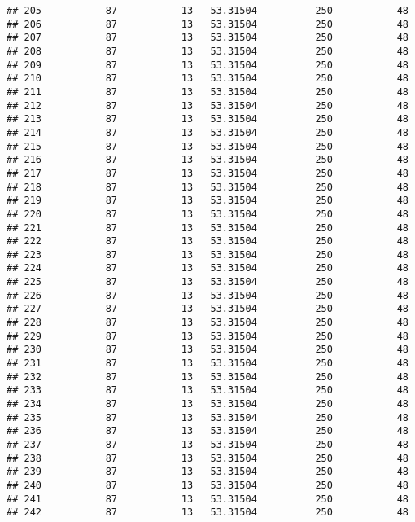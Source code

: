 \documentclass[]{article}
\begin{document}
\begin{verbatim}
## 205           87           13   53.31504          250           48
## 206           87           13   53.31504          250           48
## 207           87           13   53.31504          250           48
## 208           87           13   53.31504          250           48
## 209           87           13   53.31504          250           48
## 210           87           13   53.31504          250           48
## 211           87           13   53.31504          250           48
## 212           87           13   53.31504          250           48
## 213           87           13   53.31504          250           48
## 214           87           13   53.31504          250           48
## 215           87           13   53.31504          250           48
## 216           87           13   53.31504          250           48
## 217           87           13   53.31504          250           48
## 218           87           13   53.31504          250           48
## 219           87           13   53.31504          250           48
## 220           87           13   53.31504          250           48
## 221           87           13   53.31504          250           48
## 222           87           13   53.31504          250           48
## 223           87           13   53.31504          250           48
## 224           87           13   53.31504          250           48
## 225           87           13   53.31504          250           48
## 226           87           13   53.31504          250           48
## 227           87           13   53.31504          250           48
## 228           87           13   53.31504          250           48
## 229           87           13   53.31504          250           48
## 230           87           13   53.31504          250           48
## 231           87           13   53.31504          250           48
## 232           87           13   53.31504          250           48
## 233           87           13   53.31504          250           48
## 234           87           13   53.31504          250           48
## 235           87           13   53.31504          250           48
## 236           87           13   53.31504          250           48
## 237           87           13   53.31504          250           48
## 238           87           13   53.31504          250           48
## 239           87           13   53.31504          250           48
## 240           87           13   53.31504          250           48
## 241           87           13   53.31504          250           48
## 242           87           13   53.31504          250           48

\end{verbatim}
\end{document}
